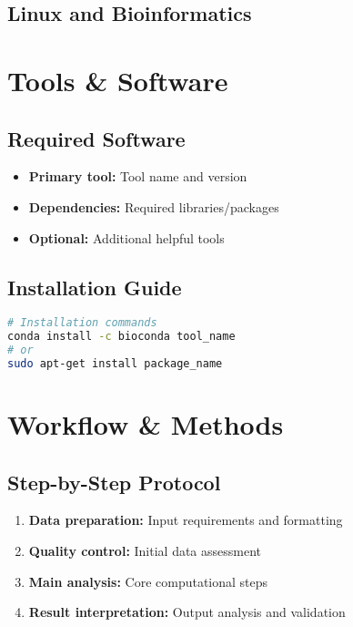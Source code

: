 \documentclass[a4paper,11pt]{article}
\begin{document}
\subsection{Linux and Bioinformatics}

\section{Tools \& Software}

\subsection{Required Software}

\begin{itemize}
    \item \textbf{Primary tool:} Tool name and version
    \item \textbf{Dependencies:} Required libraries/packages
    \item \textbf{Optional:} Additional helpful tools
\end{itemize}

\subsection{Installation Guide}
\begin{lstlisting}[language=bash, caption=Software installation]
# Installation commands
conda install -c bioconda tool_name
# or
sudo apt-get install package_name
\end{lstlisting}

\section{Workflow \& Methods}

\subsection{Step-by-Step Protocol}

\begin{enumerate}
    \item \textbf{Data preparation:} Input requirements and formatting
    \item \textbf{Quality control:} Initial data assessment
    \item \textbf{Main analysis:} Core computational steps
    \item \textbf{Result interpretation:} Output analysis and validation
\end{enumerate}
\end{document}
